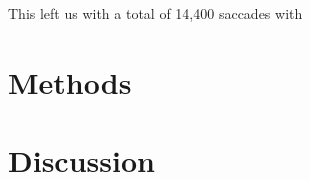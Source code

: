 \documentclass[a4paper, oneside, 11pt, onecolumn]{article}
\begin{document}
This left us with a total of 14,400 saccades with 

\section{Methods}



\section{Discussion}
\end{document}
